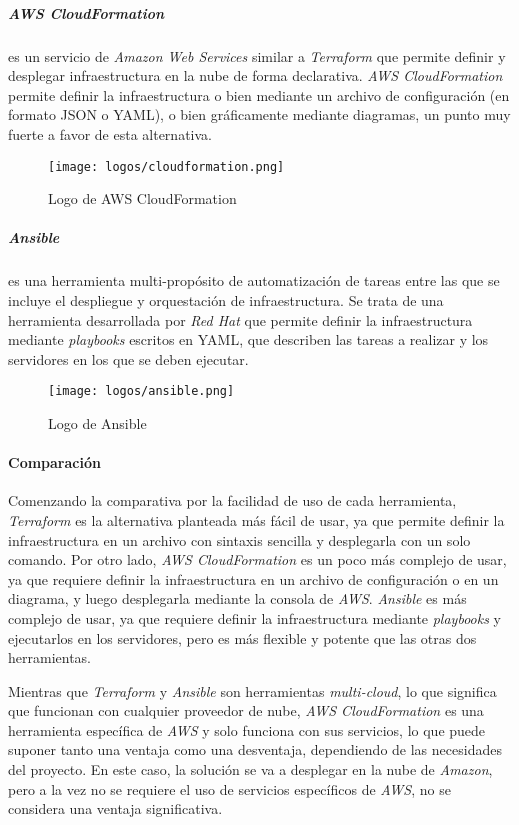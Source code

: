 \subparagraph{AWS CloudFormation} es un servicio de \textit{Amazon Web Services}
similar a \textit{Terraform} que permite definir y desplegar infraestructura en
la nube de forma declarativa. \textit{AWS CloudFormation} permite definir la
infraestructura o bien mediante un archivo de configuración (en formato JSON o
YAML), o bien gráficamente mediante diagramas, un punto muy fuerte a favor de
esta alternativa.

\begin{figure}[H]
	\centering
	\texttt{[image: logos/cloudformation.png]}
	\caption{Logo de AWS CloudFormation~\textregistered}
	\label{fig:cloudformation}
\end{figure}

\subparagraph{Ansible} es una herramienta multi-propósito de automatización de tareas
entre las que se incluye el despliegue y orquestación de infraestructura. Se
trata de una herramienta desarrollada por \textit{Red Hat} que permite definir
la infraestructura mediante \textit{playbooks} escritos en YAML, que describen
las tareas a realizar y los servidores en los que se deben ejecutar.

\begin{figure}[H]
	\centering
	\texttt{[image: logos/ansible.png]}
	\caption{Logo de Ansible~\textregistered}
	\label{fig:ansible}
\end{figure}

\paragraph{Comparación}
Comenzando la comparativa por la facilidad de uso de cada herramienta,
\textit{Terraform} es la alternativa planteada más fácil de usar, ya que permite
definir la infraestructura en un archivo con sintaxis sencilla y desplegarla con
un solo comando. Por otro lado, \textit{AWS CloudFormation} es un poco más
complejo de usar, ya que requiere definir la infraestructura en un archivo de
configuración o en un diagrama, y luego desplegarla mediante la consola de
\textit{AWS}. \textit{Ansible} es más complejo de usar, ya que requiere definir
la infraestructura mediante \textit{playbooks} y ejecutarlos en los servidores,
pero es más flexible y potente que las otras dos herramientas.

Mientras que \textit{Terraform} y \textit{Ansible} son herramientas
\textit{multi-cloud}, lo que significa que funcionan con cualquier proveedor de
nube, \textit{AWS CloudFormation} es una herramienta específica de \textit{AWS}
y solo funciona con sus servicios, lo que puede suponer tanto una ventaja como
una desventaja, dependiendo de las necesidades del proyecto. En este caso, la
solución se va a desplegar en la nube de \textit{Amazon}, pero a la vez no se
requiere el uso de servicios específicos de \textit{AWS}, no se considera una
ventaja significativa.

